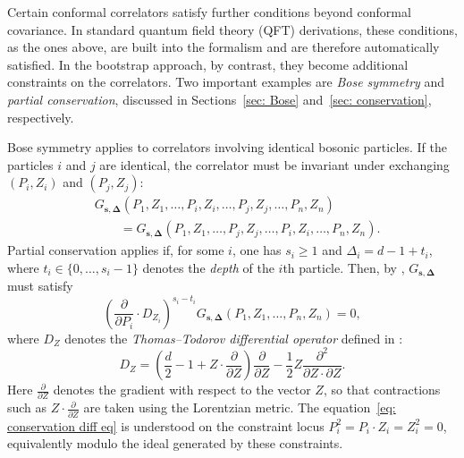 \documentclass[12pt,a4paper]{extarticle}
\theoremstyle{definition}
\begin{document}
Certain conformal correlators satisfy further conditions beyond conformal
covariance. In standard quantum field theory (QFT) derivations, 
these conditions, as the ones above, are built into the formalism and are therefore automatically satisfied. 
In the bootstrap approach, by contrast, they become additional constraints on the correlators.
Two important examples are \textit{Bose symmetry} and
\textit{partial conservation}, discussed in Sections~\ref{sec: Bose}
and~\ref{sec: conservation}, respectively.

\medskip

Bose symmetry applies to correlators involving identical bosonic particles. If
the particles $i$ and $j$ are identical, the correlator must be
invariant under exchanging $(P_i,Z_i)$ and $(P_j,Z_j)$:
\begin{equation} \label{eq:bose}
\begin{split}
    &G_{\mathbf{s},\mathbf{\Delta}}(P_1,Z_1,\ldots,P_i,Z_i,\ldots,P_j,Z_j,\ldots,P_n,Z_n)\\
    &\qquad =
    G_{\mathbf{s},\mathbf{\Delta}}(P_1,Z_1,\ldots,P_j,Z_j,\ldots,P_i,Z_i,\ldots,P_n,Z_n).
\end{split}
\end{equation}
Partial conservation applies if, for some $i$, one has $s_i\geq 1$ and
$\Delta_i=d-1+t_i$, where $t_i\in\{0,\ldots,s_i-1\}$ denotes the \textit{depth} 
of the $i$th particle. Then, by \cite{DNW}, $G_{\mathbf{s},\mathbf{\Delta}}$
must satisfy
\begin{equation}\label{eq: conservation diff eq}
    \left(\frac{\partial}{\partial P_i}\cdot D_{Z_i}\right)^{s_i-t_i}
    G_{\mathbf{s},\mathbf{\Delta}}(P_1,Z_1,\ldots,P_n,Z_n)=0,
\end{equation}
where $D_Z$ denotes  the \emph{Thomas–Todorov differential operator} defined in \cite[1.30a]{DPPT}:
\begin{equation}
    D_{Z}
    =
    \left(\frac{d}{2}-1+Z\cdot\frac{\partial}{\partial Z}\right)
    \frac{\partial}{\partial Z}
    -\frac{1}{2}Z
    \frac{\partial^2}{\partial Z\cdot\partial Z}.
\end{equation}
Here $\frac{\partial}{\partial Z}$ denotes the gradient with respect to the vector $Z$, so that contractions such as
$Z\cdot\frac{\partial}{\partial Z}$ are taken using the Lorentzian
metric. The equation~\eqref{eq: conservation diff eq} is understood on the constraint locus
$P_i^2=P_i\cdot Z_i=Z_i^2=0$, equivalently modulo the ideal generated by these
constraints.

\medskip
\end{document}
